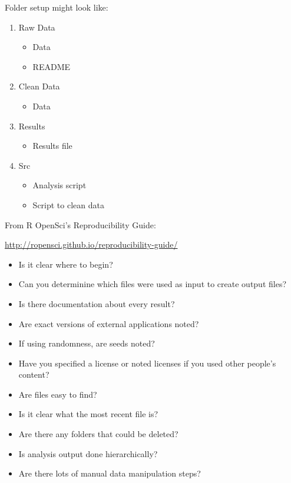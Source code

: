 \documentclass[12pt]{article}
\providecommand{\tightlist}{%
  \setlength{\itemsep}{0pt}\setlength{\parskip}{0pt}}
\begin{document}
Folder setup might look like:

\begin{enumerate}
\def\labelenumi{\arabic{enumi}.}
\tightlist
\item
  Raw Data

  \begin{itemize}
  \tightlist
  \item
    Data
  \item
    README
  \end{itemize}
\item
  Clean Data

  \begin{itemize}
  \tightlist
  \item
    Data
  \end{itemize}
\item
  Results

  \begin{itemize}
  \tightlist
  \item
    Results file
  \end{itemize}
\item
  Src

  \begin{itemize}
  \tightlist
  \item
    Analysis script
  \item
    Script to clean data
  \end{itemize}
\end{enumerate}

\citet{kitzes2017practice}

From R OpenSci's Reproducibility Guide:

\url{http://ropensci.github.io/reproducibility-guide/}

\begin{itemize}
\tightlist
\item
  Is it clear where to begin?
\item
  Can you determinine which files were used as input to create output
  files?
\item
  Is there documentation about every result?
\item
  Are exact versions of external applications noted?
\item
  If using randomness, are seeds noted?
\item
  Have you specified a license or noted licenses if you used other
  people's content?
\item
  Are files easy to find?
\item
  Is it clear what the most recent file is?
\item
  Are there any folders that could be deleted?
\item
  Is analysis output done hierarchically?
\item
  Are there lots of manual data manipulation steps?
\end{itemize}
\end{document}
